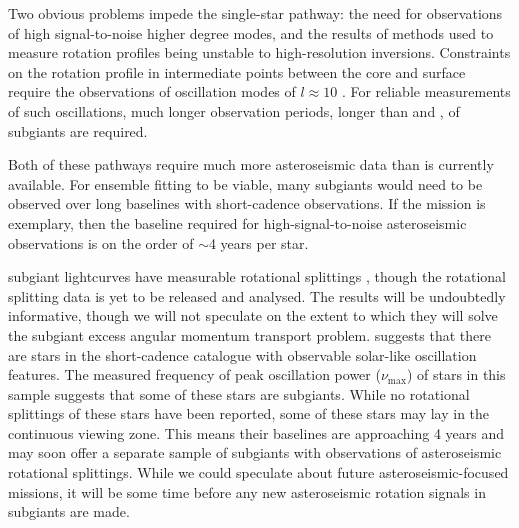 Two obvious problems impede the single-star pathway: the need for observations of high signal-to-noise higher degree modes, and the results of methods used to measure rotation profiles being unstable to high-resolution inversions. 
Constraints on the rotation profile in intermediate points between the core and surface require the observations of oscillation modes of $l \approx 10$ \citep{ahlborn_asteroseismic_2020}. 
For reliable measurements of such oscillations, much longer observation periods, longer than \corot{} and \kepler{}, of subgiants are required.
   
Both of these pathways require much more asteroseismic data than is currently available.
For ensemble fitting to be viable, many subgiants would need to be observed over long baselines with short-cadence observations.
If the \kepler{} mission is exemplary, then the baseline required for high-signal-to-noise asteroseismic observations is on the order of $\sim$4 years per star.

 subgiant lightcurves have measurable rotational splittings \citep{li_asteroseismology_2020-1,li_asteroseismology_2020}, though the rotational splitting data is yet to be released and analysed.
The results will be undoubtedly informative, though we will not speculate on the extent to which they will solve the subgiant excess angular momentum transport problem.
\citet{hatt_catalogue_2023} suggests that there are  stars in the \tess{} short-cadence catalogue with observable solar-like oscillation features.
The measured frequency of peak oscillation power ($\nu_{\text{max}}$) of stars in this sample suggests that some of these stars are subgiants.
While no rotational splittings of these stars have been reported, some of these stars may lay in the continuous viewing zone.
This means their baselines are approaching 4 years and may soon offer a separate sample of subgiants with observations of asteroseismic rotational splittings.
While we could speculate about future asteroseismic-focused missions, it will be some time before any new asteroseismic rotation signals in subgiants are made.

